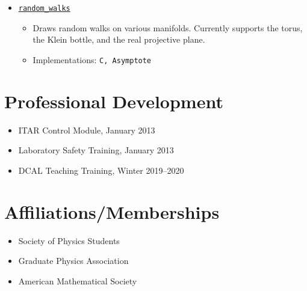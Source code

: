 \documentclass[letterpaper,sans]{moderncv}
\begin{document}
\begin{itemize}
\begin{itemize}
\[{                                +%
                                \textrm{dist}\big((x,\,y),\,\mathcal{D}\big)%
                            }.
                        \]
                        The provided example uses the Chinese characters
                        \textit{tu} and \textit{dou}, which together translate
                        to \textit{potato} in English, a running joke in my
                        topology class during the summer of 2022.
                    \item
                        Implementations: \texttt{C}
                \end{itemize}
            \item
                \href{%
                    https://github.com/ryanmaguire/random_walks/%
                }{\texttt{random\_walks}}
                \begin{itemize}
                    \item
                        Draws random walks on various manifolds. Currently
                        supports the torus, the Klein bottle, and the real
                        projective plane.
                    \item Implementations: \texttt{C, Asymptote}
                \end{itemize}
        \end{itemize}
    \section{Professional Development}
        \begin{itemize}
            \item ITAR Control Module, January 2013
            \item Laboratory Safety Training, January 2013
            \item DCAL Teaching Training, Winter 2019--2020
        \end{itemize}
    \section{Affiliations/Memberships}
        \begin{itemize}
            \item Society of Physics Students
            \item Graduate Physics Association
            \item American Mathematical Society
        \end{itemize}
\end{document}
